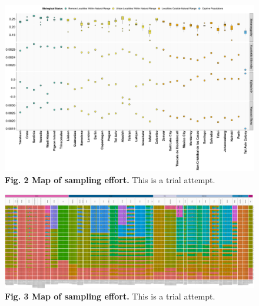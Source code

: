 \documentclass[twoside, british, a4paper]{article}
\begin{document}
\begin{figure}[!ht]
\centering
\includegraphics[scale=0.4]{../FPG--Plots/FPG--PopGenEstimates/FPG--PopGenEstimates.pdf}
\caption*{ \scriptsize \textbf{Fig. 2 Map of sampling effort.} This is a trial attempt.}
\label{MainText:FPGP--PopGenEstimates}
\end{figure}

\begin{figure}[!ht]
\centering
\includegraphics[scale=0.17]{../FPG--Plots/FPG--ngsAdmix/FPG--ngsAdmix.pdf}
\caption*{ \scriptsize \textbf{Fig. 3 Map of sampling effort.} This is a trial attempt.}
\label{MainText:FPG--ngsAdmix}
\end{figure}
\end{document}
